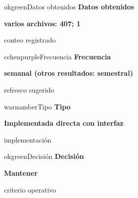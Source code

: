 \documentclass[9pt,a4paper]{extarticle}
\begin{document}
\vspace{0.04cm}
\begin{minipage}{0.24\textwidth}
\begin{metricbox}{okgreen}{Datos obtenidos}
{\large\bfseries Datos obtenidos}\par
{\Large\bfseries varios archivos: 407; 1}\par
{\normalsize conteo registrado}
\end{metricbox}
\end{minipage}\hfill
\begin{minipage}{0.24\textwidth}
\begin{metricbox}{cchenpurple}{Frecuencia}
{\large\bfseries Frecuencia}\par
{\large\bfseries semanal (otros resultados: semestral)}\par
{\normalsize refresco sugerido}
\end{metricbox}
\end{minipage}\hfill
\begin{minipage}{0.24\textwidth}
\begin{metricbox}{warnamber}{Tipo}
{\large\bfseries Tipo}\par
{\normalsize\bfseries Implementada directa con interfaz}\par
{\normalsize implementación}
\end{metricbox}
\end{minipage}\hfill
\begin{minipage}{0.24\textwidth}
\begin{metricbox}{okgreen}{Decisión}
{\large\bfseries Decisión}\par
{\normalsize\bfseries Mantener}\par
{\normalsize criterio operativo}
\end{metricbox}
\end{minipage}
\end{document}

